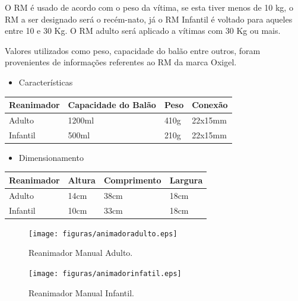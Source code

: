 O RM é usado de acordo com o peso da vítima, se esta tiver menos de 10 kg, o RM a ser designado será o recém-nato, já o RM Infantil é voltado para aqueles entre 10 e 30 Kg. O RM adulto será aplicado a vítimas com 30 Kg ou mais.

Valores utilizados como peso, capacidade do balão entre outros, foram provenientes de informações referentes ao RM da marca Oxigel.

\begin{itemize}
	\item Características
\end{itemize}

\begin{table}[H]
\begin{tabular}{|l|l|l|l|}
\hline
\multicolumn{1}{|c|}{Reanimador} & Capacidade do Balão & Peso & Conexão \\ \hline
Adulto                           & 1200ml              & 410g & 22x15mm \\ \hline
Infantil                         & 500ml               & 210g & 22x15mm \\ \hline
\end{tabular}
\end{table}


\begin{itemize}
	\item Dimensionamento
\end{itemize}

\begin{table}[H]
\begin{tabular}{|l|l|l|l|}
\hline
\multicolumn{1}{|c|}{Reanimador} & Altura & Comprimento & Largura \\ \hline
Adulto                           & 14cm   & 38cm        & 18cm    \\ \hline
Infantil                         & 10cm   & 33cm        & 18cm    \\ \hline
\end{tabular}
\end{table}


\begin{figure}[H]
	\centering
	  \texttt{[image: figuras/animadoradulto.eps]}
	\caption{Reanimador Manual Adulto.}
	\label{fig:animadoradulto}
\end{figure}

\begin{figure}[H]
	\centering
	  \texttt{[image: figuras/animadorinfatil.eps]}
	\caption{ Reanimador Manual Infantil.}
	\label{fig:animadorinfatil}
\end{figure}


